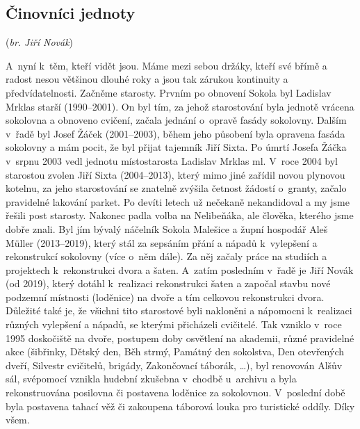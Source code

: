 \documentclass[a5paper, 12pt, twoside]{article}
\begin{document}
\subsection{Činovníci jednoty}

(\textit{br. Jiří Novák})

A~nyní k~těm, kteří vidět jsou. Máme mezi sebou držáky, kteří své břímě
a radost nesou většinou dlouhé roky a jsou tak zárukou kontinuity a
předvídatelnosti. Začněme starosty. Prvním po obnovení Sokola byl
Ladislav Mrklas starší (1990--2001). On byl tím, za jehož
starostování byla jednotě vrácena sokolovna a obnoveno cvičení, začala
jednání o~opravě fasády sokolovny. Dalším v~řadě byl Josef Žáček
(2001--2003), během jeho působení byla opravena fasáda
sokolovny a mám pocit, že byl přijat tajemník Jiří Sixta. Po úmrtí
Josefa Žáčka v~srpnu 2003 vedl jednotu místostarosta Ladislav Mrklas ml.
V~roce 2004 byl starostou zvolen Jiří Sixta (2004--2013),
který mimo jiné zařídil novou plynovou kotelnu, za jeho starostování se
znatelně zvýšila četnost žádostí o~granty, začalo pravidelné lakování
parket. Po devíti letech už nečekaně nekandidoval a my jsme řešili post
starosty. Nakonec padla volba na Nelibeňáka, ale člověka, kterého jsme
dobře znali. Byl jím bývalý náčelník Sokola Malešice a župní hospodář
Aleš Müller (2013--2019), který stál za sepsáním přání a
nápadů k~vylepšení a rekonstrukcí sokolovny (více o~něm dále). Za něj
začaly práce na studiích a projektech k~rekonstrukci dvora a šaten.
A~zatím posledním v~řadě je Jiří Novák (od 2019), který dotáhl k~realizaci
rekonstrukci šaten a započal stavbu nové podzemní místnosti (loděnice)
na dvoře a tím celkovou rekonstrukci dvora. Důležité také je, že všichni
tito starostové byli nakloněni a nápomocni k~realizaci různých vylepšení
a nápadů, se kterými přicházeli cvičitelé. Tak vzniklo v~roce 1995
doskočiště na dvoře, postupem doby osvětlení na akademii, různé
pravidelné akce (šibřinky, Dětský den, Běh strmý, Památný den sokolstva,
Den otevřených dveří, Silvestr cvičitelů, brigády, Zakončovací táborák,
\ldots), byl renovován Alšův sál, svépomocí vznikla hudební zkušebna
v~chodbě u~archivu a byla rekonstruována posilovna či postavena loděnice
za sokolovnou. V~poslední době byla postavena tahací věž či zakoupena
táborová louka pro turistické oddíly. Díky všem.
\end{document}

